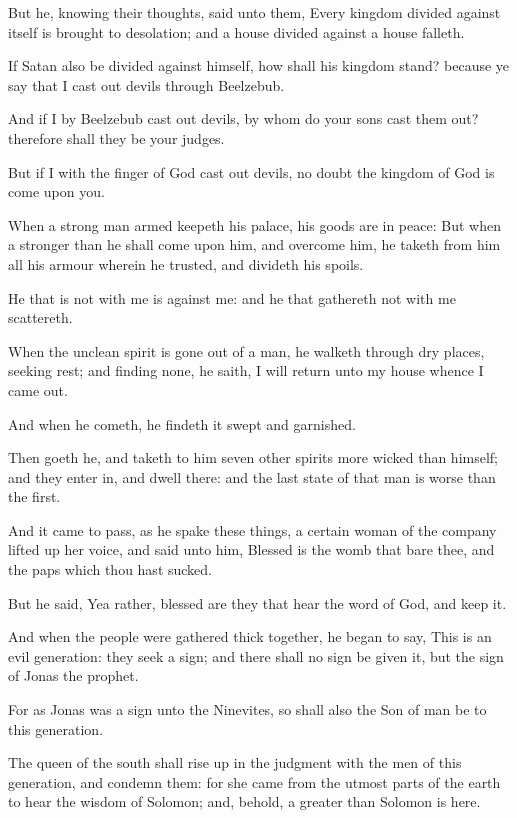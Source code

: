 \verse But he, knowing their thoughts, said unto them, Every kingdom divided against itself is brought to desolation; and a house divided against a house falleth.

\verse If Satan also be divided against himself, how shall his kingdom stand? because ye say that I cast out devils through Beelzebub.

\verse And if I by Beelzebub cast out devils, by whom do your sons cast them out? therefore shall they be your judges.

\verse But if I with the finger of God cast out devils, no doubt the kingdom of God is come upon you.

\verse When a strong man armed keepeth his palace, his goods are in peace: \verse But when a stronger than he shall come upon him, and overcome him, he taketh from him all his armour wherein he trusted, and divideth his spoils.

\verse He that is not with me is against me: and he that gathereth not with me scattereth.

\verse When the unclean spirit is gone out of a man, he walketh through dry places, seeking rest; and finding none, he saith, I will return unto my house whence I came out.

\verse And when he cometh, he findeth it swept and garnished.

\verse Then goeth he, and taketh to him seven other spirits more wicked than himself; and they enter in, and dwell there: and the last state of that man is worse than the first.

\verse And it came to pass, as he spake these things, a certain woman of the company lifted up her voice, and said unto him, Blessed is the womb that bare thee, and the paps which thou hast sucked.

\verse But he said, Yea rather, blessed are they that hear the word of God, and keep it.

\verse And when the people were gathered thick together, he began to say, This is an evil generation: they seek a sign; and there shall no sign be given it, but the sign of Jonas the prophet.

\verse For as Jonas was a sign unto the Ninevites, so shall also the Son of man be to this generation.

\verse The queen of the south shall rise up in the judgment with the men of this generation, and condemn them: for she came from the utmost parts of the earth to hear the wisdom of Solomon; and, behold, a greater than Solomon is here.

